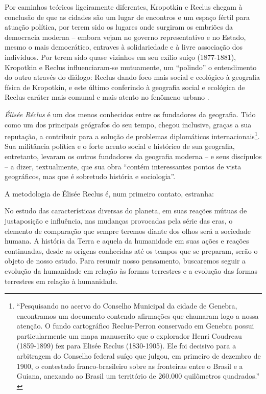 Por caminhos teóricos ligeiramente diferentes, Kropotkin e Reclus chegam à conclusão de que as cidades são um lugar de encontros e um espaço fértil para atuação política, por terem sido os lugares onde surgiram os embriões da democracia moderna -- embora vejam no governo representativo e no Estado, mesmo o mais democrático, entraves à solidariedade e à livre associação dos indivíduos. Por terem sido quase vizinhos em seu exílio suíço (1877-1881), Kropotkin e Reclus influenciaram-se mutuamente, um ``polindo'' o entendimento do outro através do diálogo: Reclus dando foco mais social e ecológico à geografia física de Kropotkin, e este último conferindo à geografia social e ecológica de Reclus caráter mais comunal e mais atento no fenômeno urbano \cite[p.~209-210]{WARD2010}.

\textit{Élisée Réclus} é um dos menos conhecidos entre os fundadores da geografia. Tido como um dos principais geógrafos do seu tempo, chegou inclusive, graças a sua reputação, a contribuir para a solução de problemas diplomáticos internacionais\footnote{``Pesquisando no acervo do Conselho Municipal da cidade de Genebra, encontramos um documento contendo afirmações que chamaram logo a nossa atenção. O fundo cartográfico Reclus-Perron conservado em Genebra possui particularmente um mapa manuscrito que o explorador Henri Coudreau (1859-1899) fez para Elisée Reclus (1830-1905). Ele foi decisivo para a arbitragem do Conselho federal suíço que julgou, em primeiro de dezembro de 1900, o contestado franco-brasileiro sobre as fronteiras entre o Brasil e a Guiana, anexando ao Brasil um território de 260.000 quilômetros quadrados.'' \cite[p.~2]{FERRETTI2013}}. Sua militância política e o forte acento social e histórico de sua geografia, entretanto, levaram os outros fundadores da geografia moderna -- e seus discípulos -- a dizer, textualmente, que sua obra ``contém interessantes pontos de vista geográficos, mas que é sobretudo história e sociologia''.

A metodologia de Élisée Reclus é, num primeiro contato, estranha:

\begin{citacao}
No estudo das características diversas do planeta, em suas reações mútuas de justaposição e influência, nas mudanças provocadas pela série das eras, o elemento de comparação que sempre teremos diante dos olhos será a sociedade humana. A história da Terra e aquela da humanidade em suas ações e reações continuadas, desde as origens conhecidas até os tempos que se preparam, serão o objeto de nosso estudo. Para resumir nosso pensamento, buscaremos seguir a evolução da humanidade em relação às formas terrestres e a evolução das formas terrestres em relação à humanidade. \cite[pp.~78-79]{reclus_renovacao_2010}
\end{citacao}

